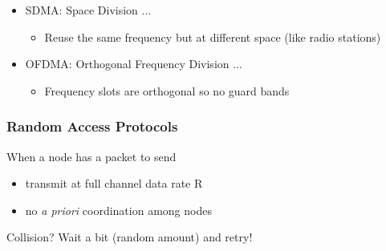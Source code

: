 \documentclass{article}
\begin{document}
\begin{itemize}
	\item SDMA: Space Division ...
	\begin{itemize}
		\item Reuse the same frequency but at different space (like radio stations)
	\end{itemize}
	
	\item OFDMA: Orthogonal Frequency Division ...
	\begin{itemize}
		\item Frequency slots are orthogonal so no guard bands
	\end{itemize}
\end{itemize}

\subsubsection*{Random Access Protocols}

When a node has a packet to send
\begin{itemize}
	\item transmit at full channel data rate R
	\item no \textit{a priori} coordination among nodes
\end{itemize}

\noindent Collision? Wait a bit (random amount) and retry!
\end{document}
